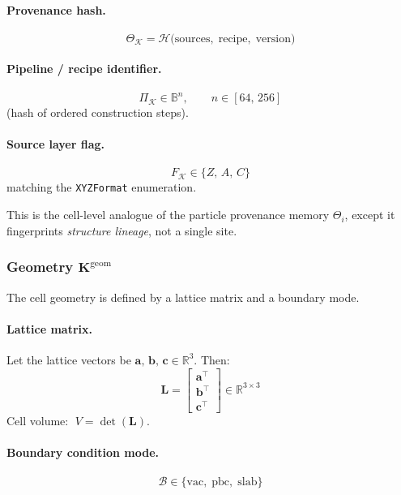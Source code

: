 \documentclass[11pt, a4paper, oneside]{article}
\theoremstyle{definition}
\theoremstyle{remark}
\newcommand{\R}{\mathbb{R}}
\newcommand{\Bset}{\mathbb{B}}
\newcommand{\boldK}{\mathbf{K}}
\newcommand{\boldL}{\mathbf{L}}
\begin{document}
\paragraph{Provenance hash.}
\[
  \Theta_{\mathcal{K}} =
  \mathcal{H}\!\bigl(\text{sources},\;
                      \text{recipe},\;
                      \text{version}\bigr)
\]

\paragraph{Pipeline / recipe identifier.}
\[
  \Pi_{\mathcal{K}} \in \Bset^{n}, \qquad n \in [64,\,256]
\]
(hash of ordered construction steps).

\paragraph{Source layer flag.}
\[
  F_{\mathcal{K}} \in \{Z,\,A,\,C\}
\]
matching the \texttt{XYZFormat} enumeration.

\medskip\noindent
This is the cell-level analogue of the particle provenance memory
$\Theta_i$, except it fingerprints \emph{structure lineage}, not a
single site.

\subsubsection{Geometry \texorpdfstring{$\boldK^{\mathrm{geom}}$}{Kgeom}}
\label{sec:cell-geometry}

The cell geometry is defined by a lattice matrix and a boundary mode.

\paragraph{Lattice matrix.}
Let the lattice vectors be
$\mathbf{a},\,\mathbf{b},\,\mathbf{c} \in \R^3$.  Then:
%
\begin{equation}
  \boldL =
  \begin{bmatrix}
    \mathbf{a}^{\!\top} \\
    \mathbf{b}^{\!\top} \\
    \mathbf{c}^{\!\top}
  \end{bmatrix}
  \in \R^{3 \times 3}
  \label{eq:lattice-matrix}
\end{equation}
%
Cell volume: $\;V = \det(\boldL)$.

\paragraph{Boundary condition mode.}
\[
  \mathcal{B} \in \{\text{vac},\;\text{pbc},\;\text{slab}\}
\]
\end{document}
